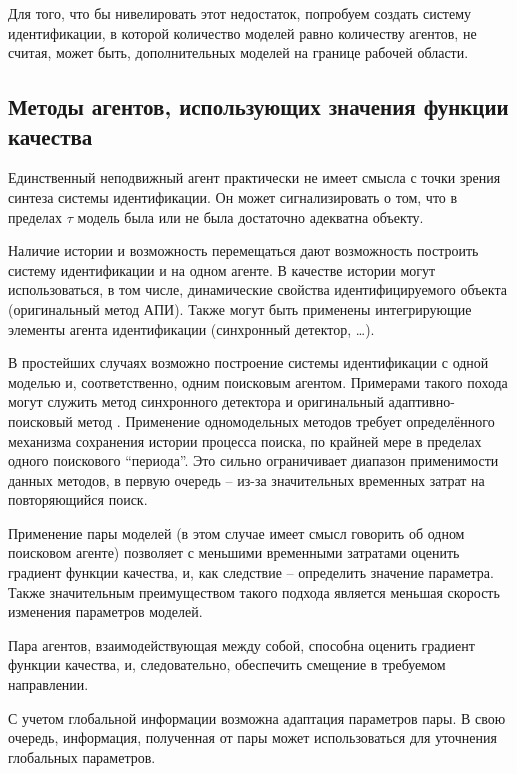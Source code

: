Для того, что бы нивелировать этот недостаток,
попробуем создать систему идентификации,
в которой количество моделей равно количеству агентов,
не считая, может быть, дополнительных моделей на границе рабочей области.





\subsection{Методы агентов, использующих значения функции качества }  %

Единственный неподвижный агент практически не имеет смысла
с точки зрения синтеза системы идентификации.
Он может сигнализировать о том, что в пределах
\(\tau\) модель была или не была достаточно адекватна
объекту.

Наличие истории и возможность перемещаться дают возможность
построить систему идентификации и на одном агенте.
В качестве истории могут использоваться, в том числе,
динамические свойства идентифицируемого объекта
(оригинальный метод АПИ). Также могут быть
применены интегрирующие элементы агента идентификации
(синхронный детектор, \ldots).

В простейших случаях возможно построение системы идентификации
с одной моделью и, соответственно, одним поисковым агентом.
Примерами такого похода могут служить
метод синхронного детектора \cite{adopt_cont_sys}
и оригинальный адаптивно-поисковый метод \cite{mich_92}.
Применение одномодельных методов требует определённого механизма
сохранения истории процесса поиска, по крайней мере в пределах
одного поискового ``периода''. Это сильно ограничивает диапазон
применимости данных методов, в первую очередь -- из-за значительных
временных затрат на повторяющийся поиск.

Применение пары моделей \cite{atu_asau3} 
(в этом случае имеет смысл говорить об одном поисковом агенте)
позволяет с меньшими временными затратами оценить градиент функции качества,
и, как следствие -- определить значение параметра. Также значительным преимуществом
такого подхода является меньшая скорость изменения параметров моделей.


Пара агентов, взаимодействующая между собой,
способна оценить градиент функции качества,
и, следовательно, обеспечить смещение в требуемом направлении.

С учетом глобальной информации возможна адаптация параметров пары.
В свою очередь, информация, полученная от пары может
использоваться для уточнения глобальных параметров.


